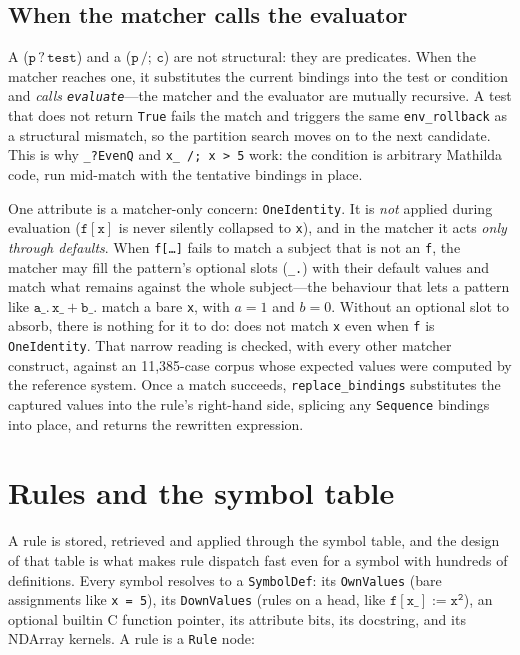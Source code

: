 \subsection*{When the matcher calls the evaluator}

A  (\(\mathtt{p\,?\,test}\)) and a 
(\(\mathtt{p\,/;\,c}\)) are not structural: they are predicates. When the matcher reaches one, it substitutes
the current bindings into the test or condition and \emph{calls
\texttt{evaluate}}---the matcher and the evaluator are mutually recursive. A test that
does not return \texttt{True} fails the match and triggers the same
\texttt{env\_rollback} as a structural mismatch, so the partition search moves on to
the next candidate. This is why \texttt{\_?EvenQ} and \texttt{x\_ /; x > 5} work: the
condition is arbitrary Mathilda code, run mid-match with the tentative bindings in
place.

One attribute is a matcher-only concern: \texttt{OneIdentity}. It is \emph{not}
applied during evaluation (\(\mathtt{f[x]}\) is never silently collapsed to
\texttt{x}), and in the matcher it acts \emph{only through defaults}. When
\texttt{f[\dots]} fails to match a subject that is not an \texttt{f}, the matcher may
fill the pattern's optional slots (\texttt{\_.}) with their default values and match
what remains against the whole subject---the behaviour that lets a pattern like
\(\mathtt{a\_.\, x\_ + b\_.}\) match a bare \texttt{x}, with \(a=1\) and \(b=0\).
Without an optional slot to absorb, there is nothing for it to do:
 does not match \texttt{x} even when \texttt{f} is \texttt{OneIdentity}.
That narrow reading is checked, with every other matcher construct, against an
11{,}385-case corpus whose expected values were computed by the reference system.
 Once a match succeeds, \texttt{replace\_bindings} substitutes the captured
values into the rule's right-hand side, splicing any \texttt{Sequence} bindings into
place, and returns the rewritten expression.

\section{Rules and the symbol table}
\label{sec:int-symtab}

A rule is stored, retrieved and applied through the symbol table, and the design of
that table is what makes rule dispatch fast even for a symbol with hundreds of
definitions. Every symbol resolves to a \texttt{SymbolDef}: its \texttt{OwnValues}
(bare assignments like \texttt{x = 5}), its \texttt{DownValues} (rules on a head, like
\(\mathtt{f[x\_] := x^2}\)), an optional builtin C function pointer, its attribute
bits, its docstring, and its NDArray kernels. A rule is a \texttt{Rule} node:

